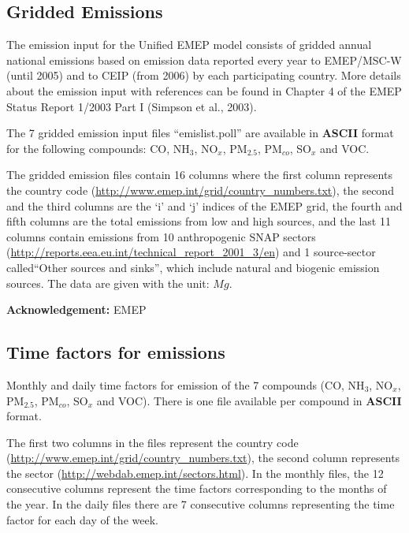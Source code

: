 \subsection{Gridded Emissions}
The emission input for the Unified EMEP model consists of gridded
annual national emissions based on emission data reported every year
to EMEP/MSC-W (until 2005) 
and to CEIP (from 2006) by each
participating country. 
More details about the emission input with references can be
found in Chapter 4 of the EMEP Status Report 1/2003 Part I 
(Simpson et al., 2003).

The 7 gridded emission input files ``emislist.poll'' are available in 
{\bf ASCII} format for the following compounds: CO, NH$_{3}$,
NO$_{x}$, PM$_{2.5}$, PM$_{co}$, SO$_{x}$ and VOC.

The gridded emission files contain 16 columns where the first column 
represents the country code
(\url{http://www.emep.int/grid/country_numbers.txt}), 
the second and the third columns are the `i' and `j' indices of the
EMEP grid, the fourth and fifth columns are the total emissions from
low and high sources, and the last 11 columns contain emissions from 
10 anthropogenic SNAP sectors 
(\url{http://reports.eea.eu.int/technical_report_2001_3/en}) and 1 
source-sector called``Other sources and sinks'', which include natural and
biogenic emission sources. The data are given with the unit: $Mg$.

{\bf Acknowledgement:} EMEP

\subsection{Time factors for emissions}

Monthly and daily time factors for emission of the 7 compounds 
(CO, NH$_{3}$, NO$_{x}$, PM$_{2.5}$, PM$_{co}$, SO$_{x}$ and VOC). 
There is one file available per compound in {\bf ASCII} format. 

The first two columns in the files represent the country code \\
(\url{http://www.emep.int/grid/country_numbers.txt}), the second column 
represents the sector (\url{http://webdab.emep.int/sectors.html}). In the monthly files, 
the 12 consecutive columns represent the time factors corresponding to 
the months of the year. In the daily files there are 7 consecutive columns representing 
the time factor for each day of the week. 


